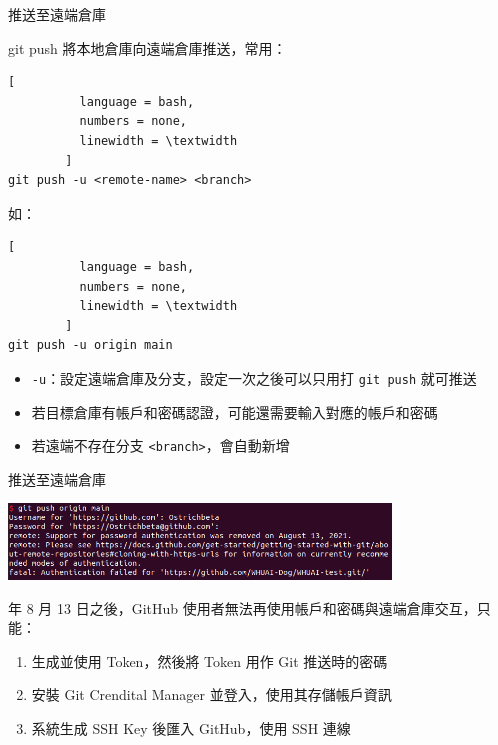\documentclass[xetex, unicode, 10pt, aspectratio=169]{beamer}
\begin{document}
\begin{frame}[fragile]{推送至遠端倉庫}
    \begin{block}{git push}
        將本地倉庫向遠端倉庫推送，常用：
        \begin{lstlisting}[
          language = bash,
          numbers = none,
          linewidth = \textwidth
        ]
git push -u <remote-name> <branch>\end{lstlisting}
        如：
        \begin{lstlisting}[
          language = bash,
          numbers = none,
          linewidth = \textwidth
        ]
git push -u origin main\end{lstlisting}
        \begin{itemize}
            \item \texttt{-u}：設定遠端倉庫及分支，設定一次之後可以只用打 \texttt{git push} 就可推送
            \item 若目標倉庫有帳戶和密碼認證，可能還需要輸入對應的帳戶和密碼
            \item 若遠端不存在分支 \texttt{\textless{}branch\textgreater{}}，會自動新增
        \end{itemize}
    \end{block}
\end{frame}

\begin{frame}{推送至遠端倉庫}
    \begin{center}
        \includegraphics[width=4in]{./img/github-cannot-push.png}

    \end{center}
     年 8 月 13 日之後，GitHub 使用者無法再使用帳戶和密碼與遠端倉庫交互，只能：
    \begin{enumerate}
        \item 生成並使用 Token，然後將 Token 用作 Git 推送時的密碼
        \item 安裝 Git Crendital Manager 並登入，使用其存儲帳戶資訊
        \item 系統生成 SSH Key 後匯入 GitHub，使用 SSH 連線
    \end{enumerate}
\end{frame}
\end{document}
